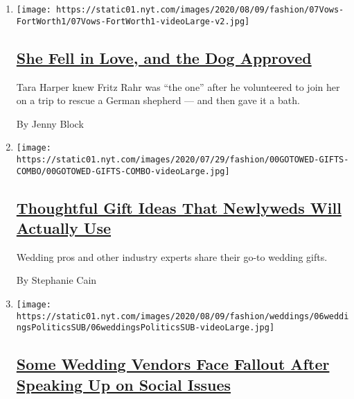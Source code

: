 \begin{enumerate}
\def\labelenumi{\arabic{enumi}.}
\item
  \texttt{[image: https://static01.nyt.com/images/2020/08/09/fashion/07Vows-FortWorth1/07Vows-FortWorth1-videoLarge-v2.jpg]}

  \hypertarget{she-fell-in-love-and-the-dog-approved}{%
  \subsection{\texorpdfstring{\href{/2020/08/07/fashion/weddings/Tara-Harper-and-Fritz-Rahr-Fort-Worth-wedding.html}{She
  Fell in Love, and the Dog
  Approved}}{She Fell in Love, and the Dog Approved}}\label{she-fell-in-love-and-the-dog-approved}}

  Tara Harper knew Fritz Rahr was ``the one'' after he volunteered to
  join her on a trip to rescue a German shepherd --- and then gave it a
  bath.

  By Jenny Block
\item
  \texttt{[image: https://static01.nyt.com/images/2020/07/29/fashion/00GOTOWED-GIFTS-COMBO/00GOTOWED-GIFTS-COMBO-videoLarge.jpg]}

  \hypertarget{thoughtful-gift-ideas-that-newlyweds-will-actually-use-1}{%
  \subsection{\texorpdfstring{\href{/2020/08/08/fashion/weddings/thoughtful-gift-ideas-that-newlyweds-will-actually-use.html}{Thoughtful
  Gift Ideas That Newlyweds Will Actually
  Use}}{Thoughtful Gift Ideas That Newlyweds Will Actually Use}}\label{thoughtful-gift-ideas-that-newlyweds-will-actually-use-1}}

  Wedding pros and other industry experts share their go-to wedding
  gifts.

  By Stephanie Cain
\item
  \texttt{[image: https://static01.nyt.com/images/2020/08/09/fashion/weddings/06weddingsPoliticsSUB/06weddingsPoliticsSUB-videoLarge.jpg]}

  \hypertarget{some-wedding-vendors-face-fallout-after-speaking-up-on-social-issues}{%
  \subsection{\texorpdfstring{\href{/2020/08/06/fashion/weddings/wedding-vendors-social-issues.html}{Some
  Wedding Vendors Face Fallout After Speaking Up on Social
  Issues}}{Some Wedding Vendors Face Fallout After Speaking Up on Social Issues}}\label{some-wedding-vendors-face-fallout-after-speaking-up-on-social-issues}}


\end{enumerate}
